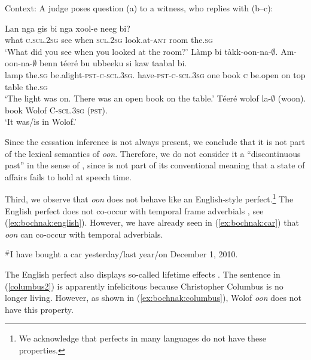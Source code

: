 \documentclass[output=paper,newtxmath,modfonts,nonflat,draftmode]{langsci/langscibook}
\begin{document}
  \begin{exe}
\ex\label{ex:bochnak:wolof1} Context: A judge poses question (a) to a witness, who replies with (b--c):
\begin{xlist}
\ex 
\gll Lan nga gis bi nga xool-e neeg bi?\\
what \textsc{c}.\textsc{scl.2sg} see when \textsc{scl.2sg} look.at-\textsc{ant} room the.\textsc{sg}\\
\glt`What did you see when you looked at the room?'
\ex
\gll L\`amp bi t\`akk-oon-na-$\emptyset$. Am-oon-na-$\emptyset$ benn t\'eer\'e bu ubbeeku si kaw taabal bi.\\
lamp the.\textsc{sg}
be.alight-\textsc{pst-c-scl.3sg}. have-\textsc{pst-c-scl.3sg}
one book \textsc{c} be.open on top table the.\textsc{sg}\\
\glt`The light was on. There was an open book on the table.'
\ex
\gll T\'eer\'e wolof la-$\emptyset$ (woon).\\
book Wolof C-\textsc{scl.3sg} (\textsc{pst}).\\
\glt `It was/is in Wolof.'\label{ex:bochnak:wolof2}

\end{xlist}
\end{exe}



Since the cessation inference is not always present, we conclude that it is not part of the lexical semantics of \textit{oon}. Therefore, we do not consider it a ``discontinuous past'' in the sense of \citet{Plungian2006}, since is not part of its conventional meaning that a state of affairs fails to hold at speech time.


Third, we observe that \textit{oon} does not behave like an English-style perfect.\footnote{We acknowledge that perfects in many languages do not have these properties.} The English perfect does not co-occur with temporal frame adverbials \citep{klein92present}, see (\ref{ex:bochnak:english}). However, we have already seen in (\ref{ex:bochnak:car}) that \textit{oon} can co-occur with temporal adverbials.

\ea\label{ex:bochnak:english}
$^{\#}$I have bought a car yesterday/last year/on December 1, 2010.
\z

The English perfect also displays so-called lifetime effects \citep{mccawley71tense}. The sentence in (\ref{columbus2}) is apparently infelicitous because Christopher Columbus is no longer living. However, as shown in (\ref{ex:bochnak:columbus}), Wolof \textit{oon} does not have this property.
\end{document}
